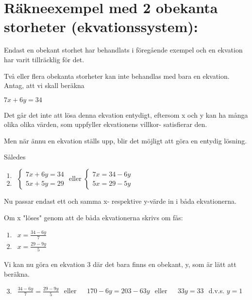 \section{Räkneexempel med 2 obekanta storheter
(ekvationssystem):}

Endast en obekant storhet har behandlats i föregående exempel och en ekvation
har varit tillräcklig för det.

Två eller flera obekanta storheter kan inte behandlas med bara en ekvation.
Antag, att vi skall beräkna

\(7x+6y=34\)

Det går det inte att lösa denna ekvation entydigt, eftersom x och y kan ha många
olika olika värden, som uppfyller ekvationens villkor- satisfierar den.

Men när ännu en ekvation ställs upp, blir det möjligt att göra en entydig
lösning.

Således

\(
\begin{array}{c}
1.\\2.
\end{array}
\) \(
\left\{
\begin{array}{l}
7x + 6y = 34\\
5x + 5y = 29
\end{array}
\right.
\) eller \(
\left\{
\begin{array}{l}
7x = 34 - 6y\\
5x = 29 - 5y 
\end{array}
\right. 
\)

Nu passar endast ett och samma x- respektive y-värde in i båda ekvationerna.

Om x "löses" genom att de båda ekvationerna skrivs om fås:

\(
\begin{array}{ll}
1. & x = \frac{34-6y}{7}\\
2. & x = \frac{29-9y}{5}
\end{array}
\)

Vi kan nu göra en ekvation 3 där det bara finns en obekant, y, som är lätt
att beräkna.

\(
\begin{array}{ll}
3. & \frac{34 - 6y}{7} = \frac{29 - 9y}{5}
\end{array}
\) eller
\(
\begin{array}{ll}
 & 170 - 6y = 203-63y
\end{array}
\) eller
\(
\begin{array}{ll}
 & 33y = 33
\end{array}
\) d.v.s. \(y = 1\)

